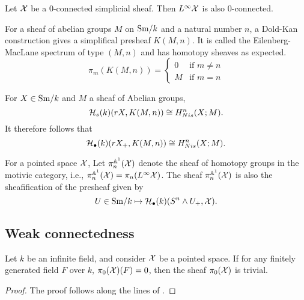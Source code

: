 \documentclass{amsart}%
\begin{document}
\begin{proposition}
  Let $\mathcal{X}$ be a $0$-connected simplicial sheaf. Then
  $L^{\infty}\mathcal{X}$ is also $0$-connected.
\end{proposition}

For a sheaf of abelian groups $M$ on $\mathrm{Sm}/k$ and a natural number $n$,
a Dold-Kan construction gives a simplifical presheaf $K(M,n)$. It is
called the Eilenberg-MacLane spectrum of type $(M,n)$ and has homotopy
sheaves as expected.
\begin{equation*}
  \pi_m(K(M,n)) = \begin{cases}0 & \text{if }m\neq n \\ M & \text{if } m = n \end{cases}
\end{equation*}

\begin{proposition}
  For $X\in\mathrm{Sm}/k$ and $M$ a sheaf of Abelian groups,
\begin{equation*}
  \mathcal{H}_s(k)(rX, K(M,n)) \cong H^n_{Nis}(X; M).
\end{equation*}
It therefore follows that
\begin{equation*}
  \mathcal{H}_{\bullet}(k)(rX_+, K(M,n)) \cong H^n_{Nis}(X; M).
\end{equation*}
\end{proposition}

\begin{notation}

  For a pointed space $\mathcal{X}$, Let $\pi_n^{\mathbb{A}^1}(\mathcal{X})$ denote the
  sheaf of homotopy groups in the motivic category, i.e.,
  $\pi^{\mathbb{A}^1}_n(\mathcal{X}) = \pi_n(L^{\infty}\mathcal{X})$.  The sheaf
  $\pi^{\mathbb{A}^1}_n(\mathcal{X})$ is also the sheafification of the presheaf
  given by
  \begin{equation*}
    U \in \mathrm{Sm}/k \mapsto \mathcal{H}_{\bullet}(k)(S^n\wedge U_+, \mathcal{X}).
  \end{equation*}
\end{notation}

\subsection{Weak connectedness}

\begin{proposition}
  Let $k$ be an infinite field, and consider $\mathcal{X}$ be a pointed
  space. If for any finitely generated field $F$ over $k$,
  $\pi_0(\mathcal{X})(F) = 0$, then the sheaf $\pi_0(\mathcal{X})$ is trivial.
\end{proposition}
\begin{proof}
  The proof follows along the lines of \cite[Lemma 6.1.3]{Mor05}.
\end{proof}
\end{document}
